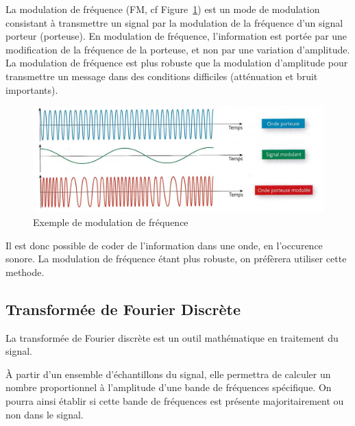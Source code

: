 \documentclass[12pt]{article}
\begin{document}
La modulation de fréquence (FM, cf Figure~\ref{fig:modFreq}) est un mode de modulation consistant à transmettre un signal par la modulation de la fréquence d'un signal porteur (porteuse).
En modulation de fréquence, l'information est portée par une modification de la fréquence de la porteuse, et non par une variation d'amplitude. La modulation de fréquence est plus robuste que la modulation d'amplitude pour transmettre un message dans des conditions difficiles (atténuation et bruit importants).
\begin{figure}[H]
\begin{center}
\caption{Exemple de modulation de fréquence}
\label{fig:modFreq}
\includegraphics[scale=0.30]{Mod_Freq.jpg}
\end{center}
\end{figure}

Il est donc possible de coder de l'information dans une onde, en l'occurence sonore.
La modulation de fréquence étant plus robuste, on préfèrera utiliser cette methode.


\subsection{Transformée de Fourier Discrète}
La transformée de Fourier discrète est un outil mathématique en traitement du signal.


À partir d'un ensemble d'échantillons du signal, elle permettra de calculer un nombre proportionnel à l'amplitude d'une bande de fréquences spécifique. On pourra ainsi établir si cette bande de fréquences est présente majoritairement ou non dans le signal.\\
\end{document}
